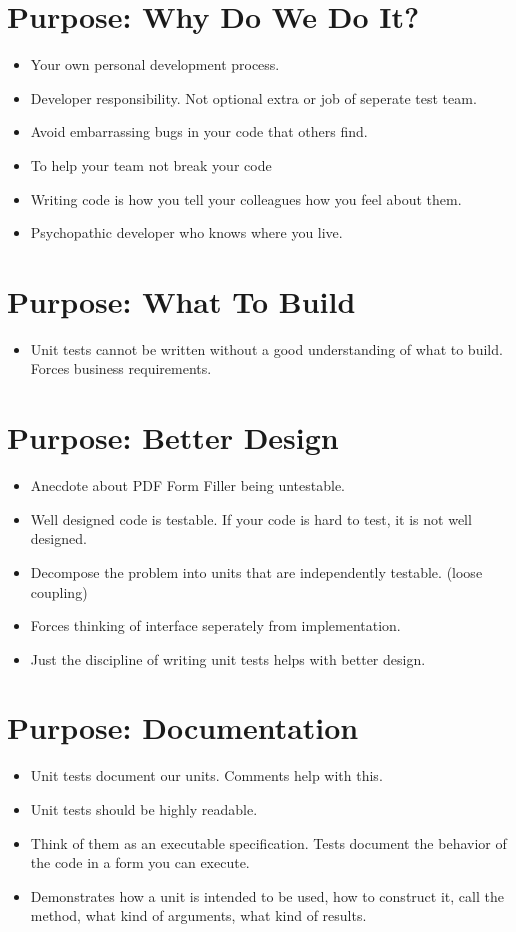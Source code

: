 \documentclass{article}
\begin{document}
\section{Purpose: Why Do We Do It?}
\begin{itemize}
    \item Your own personal development process.
    \item Developer responsibility. Not optional extra or job of seperate test team.
    \item Avoid embarrassing bugs in your code that others find.
    \item To help your team not break your code
    \item Writing code is how you tell your colleagues how you feel about them.
    \item Psychopathic developer who knows where you live.
\end{itemize}

\newpage
\section{Purpose: What To Build}
\begin{itemize}
    \item Unit tests cannot be written without a good understanding of what to
        build. Forces business requirements.
\end{itemize}

\newpage
\section{Purpose: Better Design}
\begin{itemize}
    \item Anecdote about PDF Form Filler being untestable.
    \item Well designed code is testable. If your code is hard to test, it is
        not well designed.
    \item Decompose the problem into units that are independently testable.
        (loose coupling)
    \item Forces thinking of interface seperately from implementation.
    \item Just the discipline of writing unit tests helps with better design.
\end{itemize}

\newpage
\section{Purpose: Documentation}
\begin{itemize}
    \item Unit tests document our units. Comments help with this.
    \item Unit tests should be highly readable.
    \item Think of them as an executable specification. Tests document the
        behavior of the code in a form you can execute.
    \item Demonstrates how a unit is intended to be used, how to construct
        it, call the method, what kind of arguments, what kind of results.
\end{itemize}
\end{document}
